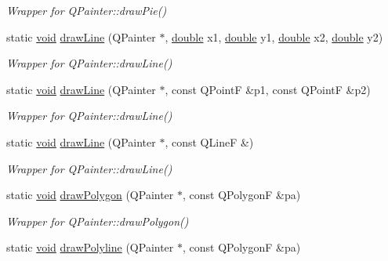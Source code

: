 \begin{DoxyCompactItemize}
\begin{DoxyCompactList}\small\item\em Wrapper for Q\-Painter\-::draw\-Pie() \end{DoxyCompactList}\item 
static \hyperlink{group___u_a_v_objects_plugin_ga444cf2ff3f0ecbe028adce838d373f5c}{void} \hyperlink{class_qwt_painter_ad90ed35a673adb9767046c05b605bcf5}{draw\-Line} (Q\-Painter $\ast$, \hyperlink{_super_l_u_support_8h_a8956b2b9f49bf918deed98379d159ca7}{double} x1, \hyperlink{_super_l_u_support_8h_a8956b2b9f49bf918deed98379d159ca7}{double} y1, \hyperlink{_super_l_u_support_8h_a8956b2b9f49bf918deed98379d159ca7}{double} x2, \hyperlink{_super_l_u_support_8h_a8956b2b9f49bf918deed98379d159ca7}{double} y2)
\begin{DoxyCompactList}\small\item\em Wrapper for Q\-Painter\-::draw\-Line() \end{DoxyCompactList}\item 
static \hyperlink{group___u_a_v_objects_plugin_ga444cf2ff3f0ecbe028adce838d373f5c}{void} \hyperlink{class_qwt_painter_a8f4ebba74be8858ca43e50fac363468c}{draw\-Line} (Q\-Painter $\ast$, const Q\-Point\-F \&p1, const Q\-Point\-F \&p2)
\begin{DoxyCompactList}\small\item\em Wrapper for Q\-Painter\-::draw\-Line() \end{DoxyCompactList}\item 
static \hyperlink{group___u_a_v_objects_plugin_ga444cf2ff3f0ecbe028adce838d373f5c}{void} \hyperlink{class_qwt_painter_af31427d37c1cfd4ddc84e013086a77e1}{draw\-Line} (Q\-Painter $\ast$, const Q\-Line\-F \&)
\begin{DoxyCompactList}\small\item\em Wrapper for Q\-Painter\-::draw\-Line() \end{DoxyCompactList}\item 
static \hyperlink{group___u_a_v_objects_plugin_ga444cf2ff3f0ecbe028adce838d373f5c}{void} \hyperlink{class_qwt_painter_a4c1d7357f894622fa87966e519f1b154}{draw\-Polygon} (Q\-Painter $\ast$, const Q\-Polygon\-F \&pa)
\begin{DoxyCompactList}\small\item\em Wrapper for Q\-Painter\-::draw\-Polygon() \end{DoxyCompactList}\item 
static \hyperlink{group___u_a_v_objects_plugin_ga444cf2ff3f0ecbe028adce838d373f5c}{void} \hyperlink{class_qwt_painter_a4dd8e432b05fceebb71d1824700a8a9a}{draw\-Polyline} (Q\-Painter $\ast$, const Q\-Polygon\-F \&pa)

\end{DoxyCompactItemize}
